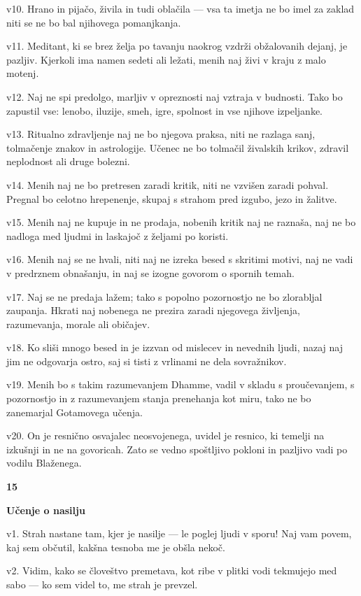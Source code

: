 v10. Hrano in pijačo, živila in tudi oblačila --- vsa ta imetja ne bo imel za zaklad niti se ne bo bal njihovega pomanjkanja.

v11. Meditant, ki se brez želja po tavanju naokrog vzdrži obžalovanih dejanj, je pazljiv. Kjerkoli ima namen sedeti ali ležati, menih naj živi v kraju z malo motenj.

v12. Naj ne spi predolgo, marljiv v opreznosti naj vztraja v budnosti. Tako bo zapustil vse: lenobo, iluzije, smeh, igre, spolnost in vse njihove izpeljanke.

v13. Ritualno zdravljenje naj ne bo njegova praksa, niti ne razlaga sanj, tolmačenje znakov in astrologije. Učenec ne bo tolmačil živalskih krikov, zdravil neplodnost ali druge bolezni.

v14. Menih naj ne bo pretresen zaradi kritik, niti ne vzvišen zaradi pohval. Pregnal bo celotno hrepenenje, skupaj s strahom pred izgubo, jezo in žalitve.

v15. Menih naj ne kupuje in ne prodaja, nobenih kritik naj ne raznaša, naj ne bo nadloga med ljudmi in laskajoč z željami po koristi.

v16. Menih naj se ne hvali, niti naj ne izreka besed s skritimi motivi, naj ne vadi v predrznem obnašanju, in naj se izogne govorom o spornih temah.

v17. Naj se ne predaja lažem; tako s popolno pozornostjo ne bo zlorabljal zaupanja. Hkrati naj nobenega ne prezira zaradi njegovega življenja, razumevanja, morale ali običajev.

v18. Ko sliši mnogo besed in je izzvan od mislecev in nevednih ljudi, nazaj naj jim ne odgovarja ostro, saj si tisti z vrlinami ne dela sovražnikov.

v19. Menih bo s takim razumevanjem Dhamme, vadil v skladu s proučevanjem, s pozornostjo in z razumevanjem stanja prenehanja kot miru, tako ne bo zanemarjal Gotamovega učenja.

v20. On je resnično osvajalec neosvojenega, uvidel je resnico, ki temelji na izkušnji in ne na govoricah. Zato se vedno spoštljivo pokloni in pazljivo vadi po vodilu Blaženega.

\textbf{15 }

\textbf{Učenje o nasilju }

v1. Strah nastane tam, kjer je nasilje --- le poglej ljudi v sporu! Naj vam povem, kaj sem občutil, kakšna tesnoba me je obšla nekoč.

v2. Vidim, kako se človeštvo premetava, kot ribe v plitki vodi tekmujejo med sabo --- ko sem videl to, me strah je prevzel.

